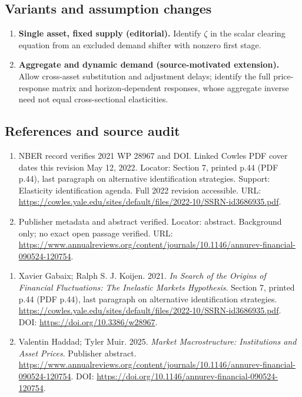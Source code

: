 \documentclass[11pt,a4paper]{article}
\begin{document}
\subsection*{Variants and assumption changes}
\begin{enumerate}
\item \textbf{Single asset, fixed supply (editorial).} Identify \(\zeta\) in the scalar clearing equation from an excluded demand shifter with nonzero first stage.
\item \textbf{Aggregate and dynamic demand (source-motivated extension).} Allow cross-asset substitution and adjustment delays; identify the full price-response matrix and horizon-dependent responses, whose aggregate inverse need not equal cross-sectional elasticities.
\end{enumerate}
\subsection*{References and source audit}
\begin{enumerate}
\item NBER record verifies 2021 WP 28967 and DOI. Linked Cowles PDF cover dates this revision May 12, 2022. Locator: Section 7, printed p.44 (PDF p.44), last paragraph on alternative identification strategies. Support: Elasticity identification agenda. Full 2022 revision accessible. URL: \url{https://cowles.yale.edu/sites/default/files/2022-10/SSRN-id3686935.pdf}.
\item Publisher metadata and abstract verified. Locator: abstract. Background only; no exact open passage verified. URL: \url{https://www.annualreviews.org/content/journals/10.1146/annurev-financial-090524-120754}.
\end{enumerate}
\begin{enumerate}\raggedright
\item\hypertarget{definitions:source:30007594:1}{} Xavier Gabaix; Ralph S. J. Koijen. 2021. \emph{In Search of the Origins of Financial Fluctuations: The Inelastic Markets Hypothesis}. Section 7, printed p.44 (PDF p.44), last paragraph on alternative identification strategies.
\url{https://cowles.yale.edu/sites/default/files/2022-10/SSRN-id3686935.pdf}.
DOI: \url{https://doi.org/10.3386/w28967}.
\item\hypertarget{definitions:source:30007594:2}{} Valentin Haddad; Tyler Muir. 2025. \emph{Market Macrostructure: Institutions and Asset Prices}. Publisher abstract.
\url{https://www.annualreviews.org/content/journals/10.1146/annurev-financial-090524-120754}.
DOI: \url{https://doi.org/10.1146/annurev-financial-090524-120754}.
\end{enumerate}
\end{document}
